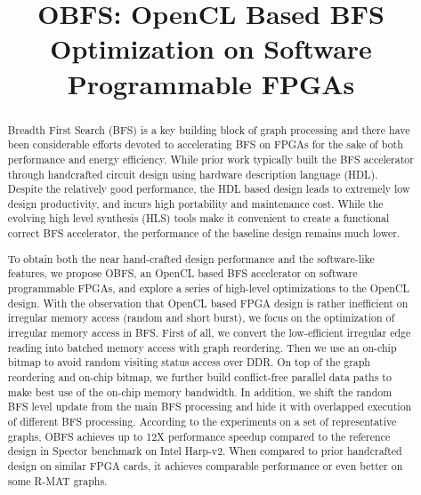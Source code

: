 \documentclass[conference]{IEEEtran}
\begin{document}
%
\title{OBFS: OpenCL Based BFS Optimization on Software Programmable FPGAs}

\maketitle

\begin{abstract}
    Breadth First Search (BFS) is a key building block of graph processing 
	and there have been considerable efforts devoted to accelerating BFS on FPGAs
	for the sake of both performance and energy efficiency. While prior work 
	typically built the BFS accelerator through handcrafted circuit design using 
	hardware description language (HDL). Despite the relatively good performance, 
	the HDL based design leads to extremely low design productivity, and incurs 
	high portability and maintenance cost. While the evolving high level synthesis (HLS) 
	tools make it convenient to create a functional correct BFS accelerator, 
	the performance of the baseline design remains much lower. 

	To obtain both the near hand-crafted design performance and the software-like features, 
	we propose OBFS, an OpenCL based BFS accelerator on software programmable FPGAs, 
	and explore a series of high-level optimizations to the OpenCL design. 
	With the observation that OpenCL based FPGA design is rather inefficient on 
	irregular memory access (random and short burst), we focus on the optimization 
	of irregular memory access in BFS. 
	First of all, we convert the low-efficient irregular edge reading into batched 
	memory access with graph reordering. Then we use an on-chip bitmap to avoid random 
	visiting status access over DDR. On top of the graph reordering and 
	on-chip bitmap, we further build conflict-free parallel data paths 
	to make best use of the on-chip memory bandwidth. In addition, we 
	shift the random BFS level update from the main BFS processing and 
	hide it with overlapped execution of different BFS processing. 
	According to the experiments on a set of representative graphs, 
	OBFS achieves up to 12X performance speedup compared to the reference design 
	in Spector benchmark on Intel Harp-v2. When compared to prior handcrafted design on 
	similar FPGA cards, it achieves comparable performance or even better on some R-MAT graphs. 
\end{abstract}
\end{document}
